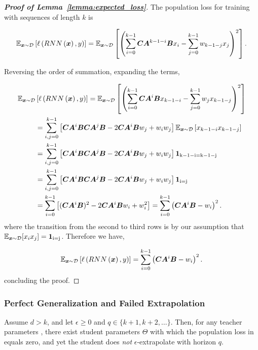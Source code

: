 \begin{proof}[\textbf{Proof of Lemma~\ref{lemma:expected_loss}}]
The population loss for training with sequences of length $k$ is

\begin{equation}
    \mathbb{E}_{{\bm{x}}\sim\mathcal{D}}\left[\ell\left( RNN\left({\bm{x}}\right), y\right)\right]=\mathbb{E}_{{\bm{x}}\sim\mathcal{D}}\left[ \left(\sum_{i=0}^{k-1}{\bm{C}}{\bm{A}}^{k-1-i}{\bm{B}} {x}_i - \sum_{j=0}^{k-1}w_{k-1-j} {x}_j\right)^2 \right].
\end{equation}

Reversing the order of summation, expanding the terms,

\begin{align}
    \mathbb{E}_{{\bm{x}}\sim\mathcal{D}}&\left[\ell\left( RNN\left({\bm{x}}\right), y\right)\right]=\mathbb{E}_{{\bm{x}}\sim\mathcal{D}}\left[ \left(\sum_{i=0}^{k-1}{\bm{C}}{\bm{A}}^{i}{\bm{B}} {x}_{k-1-i} - \sum_{j=0}^{k-1}w_{j} {x}_{k-1-j}\right)^2 \right] \\ &=  \sum_{i, j=0}^{k-1} \left[ {\bm{C}}{\bm{A}}^i{\bm{B}} {\bm{C}}{\bm{A}}^j{\bm{B}} -2{\bm{C}}{\bm{A}}^i{\bm{B}}  w_j +  w_i w_j \right] \mathbb{E}_{{\bm{x}}\sim\mathcal{D}}\left[{x}_{k-1-i} {x}_{k-1-j}\right] \\
    &=  \sum_{i, j=0}^{k-1} \left[ {\bm{C}}{\bm{A}}^i{\bm{B}} {\bm{C}}{\bm{A}}^j{\bm{B}} -2{\bm{C}}{\bm{A}}^i{\bm{B}}  w_j +  w_i w_j \right] \bm{1}_\mathrm{k-1-i = k-1-j} \\ &=  \sum_{i, j=0}^{k-1} \left[ {\bm{C}}{\bm{A}}^i{\bm{B}} {\bm{C}}{\bm{A}}^j{\bm{B}} -2{\bm{C}}{\bm{A}}^i{\bm{B}}  w_j +  w_i w_j \right] \bm{1}_\mathrm{i = j}
    \\ &=  \sum_{i =0}^{k-1} \left[ ({\bm{C}}{\bm{A}}^i{\bm{B}})^2 -2{\bm{C}}{\bm{A}}^i{\bm{B}}  w_i +  w_i^2 \right] =  \sum_{i=0}^{k-1} \left( {\bm{C}}{\bm{A}}^i{\bm{B}} - w_i \right)^2.
\end{align}
where the transition from the second to third rows is by our assumption that $\mathbb{E}_{{\bm{x}}\sim\mathcal{D}}[{x}_i{x}_j]=\bm{1}_\mathrm{i=j}$.
Therefore we have,

\begin{equation}
    \mathbb{E}_{{\bm{x}}\sim\mathcal{D}}\left[ \ell\left( RNN\left({\bm{x}}\right), y\right)\right]=  \sum_{i=0}^{k-1} \left( {\bm{C}}{\bm{A}}^i{\bm{B}} - w_i \right)^2.
\end{equation}
concluding the proof.
\end{proof}

\subsubsection{Perfect Generalization and Failed Extrapolation}\label{sec:apdx:perfect_generalization_failed_extrapolation}

\begin{proposition}
Assume $d > k$, and let $\epsilon \geq 0$ and $q \in \{ k + 1 , k + 2 , \ldots\}$.
Then, for any teacher parameters \smash{$\hat{\Theta}$}, there exist student parameters $\Theta$ with which the population loss in  equals zero, and yet the student does \emph{not} $\epsilon$-extrapolate with horizon $q$.
\end{proposition}

